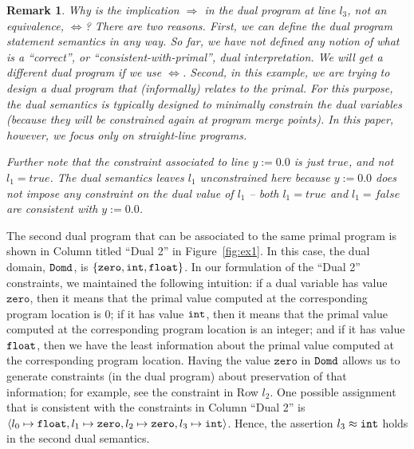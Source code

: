 \documentclass[preprint]{sig-alternate-05-2015}
\newtheorem{remark}{Remark}
\def\zero{{\tt{zero}}}
\def\float{{\tt{float}}}
\def\int{{\tt{int}}}
\def\domd{{\tt{Domd}}}
\def\zero{{\mathtt{zero}}}
\begin{document}
\begin{remark}
  Why is the implication $\Rightarrow$ in the dual program at line 
  $l_3$, not an equivalence, $\Leftrightarrow$?
  There are two reasons. First, we can define the dual program statement
  semantics in any way. So far, we have not defined any notion of what is 
  a ``correct'', or ``consistent-with-primal'', dual interpretation.
  We will get a different dual program if we use $\Leftrightarrow$.
  Second, in this example, we are trying to design a dual program that
  (informally) relates to the primal.
  For this purpose, the dual semantics is typically designed to minimally
  constrain the dual variables (because they will be constrained again
  at program merge points).  In this paper, however, we focus only on
  straight-line programs.

  Further note that the constraint associated to line $y := 0.0$ is 
  just $\mathit{true}$, and {\em{not}} $l_1 = \mathit{true}$. The dual semantics
  leaves $l_1$ unconstrained here because $y := 0.0$ does not impose 
  any constraint on the dual value of $l_1$ -- both $l_1 = \mathit{true}$
  and $l_1 = \mathit{false}$ are consistent with $y := 0.0$.

\end{remark}

The second dual program that can be associated to the same primal program
is shown in Column titled ``Dual 2'' in Figure~\ref{fig:ex1}. 
In this case, the dual domain,
$\domd$, is $\{\zero,\- \int,\- \float\}$.
In our formulation of the ``Dual 2'' constraints,
we maintained the following intuition:
if a dual variable has value $\zero$,
then it means that the primal value computed at the corresponding program location is $0$;
if it has value $\int$,
then it means that the primal value computed at the corresponding program location is
an integer; and
if it has value $\float$,
then we have the least information about the primal value computed at the corresponding program location.
Having the value $\zero$ in $\domd$ allows us to generate constraints (in the dual program) about preservation of
that information; for example, see the constraint in Row $l_2$.
One possible assignment that is consistent with the constraints in Column ``Dual 2''
is $\langle l_0 \mapsto \float, l_1 \mapsto \zero, l_2\mapsto \zero, l_3\mapsto \int\rangle$.
Hence, the assertion $l_3\approx\int$ holds in the second dual semantics.
\end{document}
